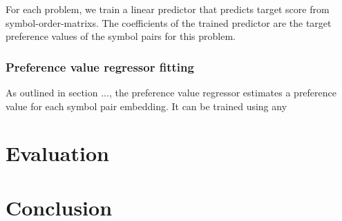 For each problem,
we train a linear predictor
that predicts target score from \glspl{symbol-order-matrix}.
The coefficients of the trained predictor are the target preference values of the symbol pairs for this problem.

\subsubsection{Preference value regressor fitting}

As outlined in section ...,
the preference value regressor estimates a preference value for each symbol pair embedding.
It can be trained using any 

\section{Evaluation}

\section{Conclusion}

\glsaddall
\printglossaries


